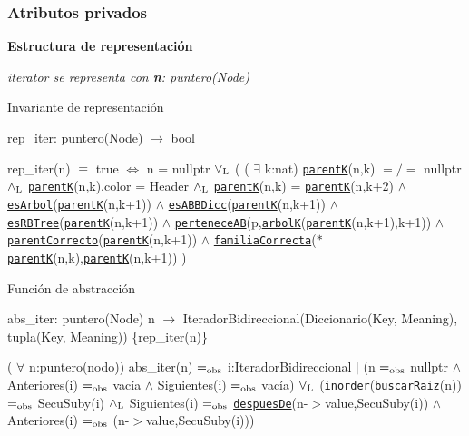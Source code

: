 \subsubsection*{Atributos privados}
\begin{Indent}{\bf Estructura de representación}\par
{\em iterator se representa con {\bfseries n}\-: puntero(\-Node)

\begin{DoxyParagraph}{Invariante de representación}

\end{DoxyParagraph}
rep\-\_\-iter\-: puntero(\-Node) $\to$ bool\par
rep\-\_\-iter(n) $\equiv$ true $\Leftrightarrow$ n = nullptr $\lor_{\rm L}$ ( ( $\exists$ k\-:nat) \href{axiomas.html#parentK}{\tt parent\-K}(n,k) $=/=$ nullptr $\land_{\rm L}$ \href{axiomas.html#parentK}{\tt parent\-K}(n,k).color = Header $\land_{\rm L}$ \href{axiomas.html#parentK}{\tt parent\-K}(n,k) = \href{axiomas.html#parentK}{\tt parent\-K}(n,k+2) $\land$ \href{axiomas.html#esArbol}{\tt es\-Arbol}(\href{axiomas.html#parentK}{\tt parent\-K}(n,k+1)) $\land$ \href{axiomas.html#esABBDicc}{\tt es\-A\-B\-B\-Dicc}(\href{axiomas.html#parentK}{\tt parent\-K}(n,k+1)) $\land$ \href{axiomas.html#esRBTree}{\tt es\-R\-B\-Tree}(\href{axiomas.html#parentK}{\tt parent\-K}(n,k+1)) $\land$ \href{axiomas.html#perteneceAB}{\tt pertenece\-A\-B}(p,\href{axiomas.html#arbolK}{\tt arbol\-K}(\href{axiomas.html#parentK}{\tt parent\-K}(n,k+1),k+1)) $\land$ \href{axiomas.html#parentCorrecto}{\tt parent\-Correcto}(\href{axiomas.html#parentK}{\tt parent\-K}(n,k+1)) $\land$ \href{axiomas.html#familiaCorrecta}{\tt familia\-Correcta}($\ast$\href{axiomas.html#parentK}{\tt parent\-K}(n,k),\href{axiomas.html#parentK}{\tt parent\-K}(n,k+1)) )

\begin{DoxyParagraph}{Función de abstracción}

\end{DoxyParagraph}
abs\-\_\-iter\-: puntero(\-Node) n $\to$ Iterador\-Bidireccional(Diccionario(Key, Meaning), tupla(Key, Meaning)) \{rep\-\_\-iter(n)\}\par
( $\forall$ n\-:puntero(nodo)) abs\-\_\-iter(n) $=_{\rm obs}$ i\-:Iterador\-Bidireccional $\vert$ (n $=_{\rm obs}$ nullptr $\land$ Anteriores(i) $=_{\rm obs}$ vacía $\land$ Siguientes(i) $=_{\rm obs}$ vacía) $\lor_{\rm L}$ (\href{axiomas.html#inorder}{\tt inorder}(\href{axiomas.html#buscarRaiz}{\tt buscar\-Raiz}(n)) $=_{\rm obs}$ Secu\-Suby(i) $\land_{\rm L}$ Siguientes(i) $=_{\rm obs}$ \href{axiomas.html#despuesDe}{\tt despues\-De}(n-\/$>$value,Secu\-Suby(i)) $\land$ Anteriores(i) $=_{\rm obs}$ (n-\/$>$value,Secu\-Suby(i)))

}
\end{Indent}
